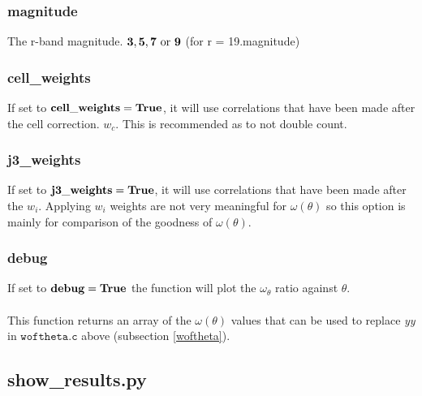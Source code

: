 \documentclass[12pt,helvetica,margin=2.5cm,a4paper,final]{iopart}
\begin{document}
\subsubsection{magnitude} The r-band magnitude. $\bold{3, 5, 7 \, \, \textrm{or} \, \, 9}$ (for r = 19.magnitude)

\subsubsection{cell\_weights} If set to $\bold{cell\_weights=True}$, it will use correlations that have been made after the cell correction. $w_c$. This is recommended as to not double count.

\subsubsection{j3\_weights} If set to $\bold{j3\_weights=True}$, it will use correlations that have been made after the $w_i$. Applying $w_i$ weights are not very meaningful for $\omega(\theta)$ so this option is mainly for comparison of the goodness of $\omega(\theta)$. 

\subsubsection{debug} If set to $\bold{debug = True}$ the function will plot the $\omega_\theta$ ratio against $\theta$.

\paragraph{} This function returns an array of the $\omega(\theta)$ values that can be used to replace \emph{yy} in $\mathtt{woftheta.c}$ above (subsection \ref{woftheta}).

\subsection{show\_results.py}
\end{document}
